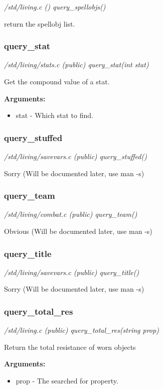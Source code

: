 {\em /std/living.c () query\_spellobjs()}

return the spellobj list.


\subsubsection{query\_stat}

{\em /std/living/stats.c (public) query\_stat(int stat)}

Get the compound value of a stat.

{\bf Arguments:}
\begin{itemize}
\item      stat - Which stat to find.
\end{itemize}


\subsubsection{query\_stuffed}

{\em /std/living/savevars.c (public) query\_stuffed()}

Sorry (Will be documented later, use man -s)


\subsubsection{query\_team}

{\em /std/living/combat.c (public) query\_team()}

Obvious (Will be documented later, use man -s)


\subsubsection{query\_title}

{\em /std/living/savevars.c (public) query\_title()}

Sorry (Will be documented later, use man -s)


\subsubsection{query\_total\_res}

{\em /std/living.c (public) query\_total\_res(string prop)}

Return the total resistance of worn objects

{\bf Arguments:}
\begin{itemize}
\item     prop - The searched for property.
\end{itemize}


